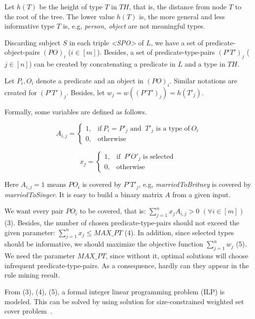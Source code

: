 \documentclass{acm_proc_article-sp}
\begin{document}
Let $h(T)$ be the height of type $T$ in $TH$, that is, the distance from node $T$ to the root of the tree. The lower value $h(T)$ is, the more general and less informative type $T$ is, e.g, \textit{person, object} are not meaningful types.

Discarding subject $S$ in each triple \textit{<SPO>} of $L$, we have a set of predicate-object-pairs $(PO)_{i}$ ($i \in [m]$). Besides, a set of predicate-type-pairs $(P'T')_{j}$ ($j \in [n]$) can be created by concatenating a predicate in $L$ and a type in $TH$.

Let $P_{i}, O_{i}$ denote a predicate and an object in $(PO)_{i}$. Similar notations are created for $(P'T')_{j}$. Besides, let $w_{j} = w((P'T')_{j}) = h(T'_{j})$.

Formally, some variables are defined as follows.

\begin{equation}
    A_{i,j} =
    \begin{cases}
      1, & \text{if}\ P_{i} = P'_{j}  \text{ and }\ T'_{j} \text{ is a type of}\ O_{i}\\
      0, & \text{otherwise}
    \end{cases}
\end{equation}

\begin{equation}
    x_{j} =
    \begin{cases}
      1, & \text{if }\ P'O'_{j} \text{ is selected}\ \\
      0, & \text{otherwise}
    \end{cases}
\end{equation}

Here $A_{i,j} = 1$ means $PO_{i}$ is covered by $P'T'_{j}$, e.g, \textit{marriedToBritney} is covered by \textit{marriedToSinger}. It is easy to build a binary matrix $A$ from a given input.

We want every pair $PO_{i}$ to be covered, that is: $\sum_{j=1}^{n}{x_{j} A_{i,j}} > 0$ $(\forall i \in [m])$ (3). Besides, the number of chosen predicate-type-pairs should not exceed the given parameter: $\sum_{j=1}^{n}{x_{j}} \leq MAX\_PT$ (4). In addition, since selected types should be informative, we should maximize the objective function $\sum_{j=1}^{n}{w_{j}}$ (5). We need the parameter $MAX\_PT$, since without it, optimal solutions will choose infrequent predicate-type-pairs. As a consequence, hardly can they appear in the rule mining result.

From (3), (4), (5), a formal integer linear programming problem (ILP) is modeled. This can be solved by using solution for size-constrained weighted set cover problem~\cite{ref3}.
\end{document}
